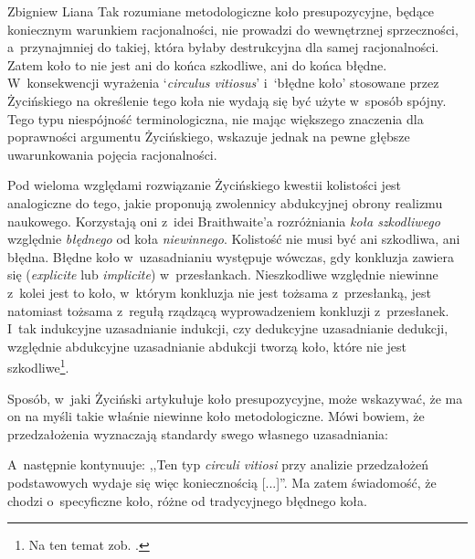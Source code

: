 \begin{artplenv}{Zbigniew Liana}
Tak rozumiane metodologiczne koło presupozycyjne, będące koniecznym warunkiem racjonalności, nie prowadzi do wewnętrznej sprzeczności, a~przynajmniej do takiej, która byłaby destrukcyjna dla samej racjonalności. Zatem koło to nie jest ani do końca szkodliwe, ani do końca błędne. W~konsekwencji wyrażenia ‘\textit{circulus vitiosus}' i~‘błędne koło' stosowane przez Życińskiego na określenie tego koła nie wydają się być użyte w~sposób spójny. Tego typu niespójność terminologiczna, nie mając większego znaczenia dla poprawności argumentu Życińskiego, wskazuje jednak na pewne głębsze uwarunkowania pojęcia racjonalności.

Pod wieloma względami rozwiązanie Życińskiego kwestii kolistości jest analogiczne do tego, jakie proponują zwolennicy abdukcyjnej obrony realizmu naukowego. Korzystają oni z~idei Braithwaite'a
\parencite*[][s.~274–278]{braithwaite_scientific_1953} %
 rozróżniania \textit{koła szkodliwego} względnie \textit{błędnego} od koła \textit{niewinnego}. Kolistość nie musi być ani szkodliwa, ani błędna. Błędne koło w~uzasadnianiu występuje wówczas, gdy konkluzja zawiera się (\textit{explicite} lub \textit{implicite}) w~przesłankach. Nieszkodliwe względnie niewinne z~kolei jest to koło, w~którym konkluzja nie jest tożsama z~przesłanką, jest natomiast tożsama z~regułą rządzącą wyprowadzeniem konkluzji z~przesłanek. I~tak indukcyjne uzasadnianie indukcji, czy dedukcyjne uzasadnianie dedukcji, względnie abdukcyjne uzasadnianie abdukcji tworzą koło, które nie jest szkodliwe\footnote{Na ten temat zob. 
\parencites[][s.~138n]{liana_naturalistyczne_2003}[][s.~84]{psillos_scientific_1999}[][s.~102n.265n]{grobler_metodologia_2006}.%
}.

Sposób, w~jaki Życiński artykułuje koło presupozycyjne, może wskazywać, że ma on na myśli takie właśnie niewinne koło metodologiczne. Mówi bowiem, że przedzałożenia wyznaczają standardy swego własnego uzasadniania:


A~następnie kontynuuje: ,,Ten typ \textit{circuli vitiosi} przy analizie przedzałożeń podstawowych wydaje się więc koniecznością [...]''. Ma zatem świadomość, że chodzi o~specyficzne koło, różne od tradycyjnego błędnego koła.


\end{artplenv}
